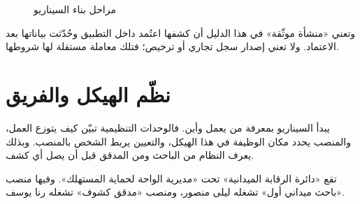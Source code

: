 \begin{figure}[H]
\centering
{}
\rclegend
\caption{مراحل بناء السيناريو}
\label{fig:scenario-build-order}
\end{figure}

وتعني «منشأة موثّقة» في هذا الدليل أن كشفها اعتُمد داخل التطبيق وحُدّثت بياناتها بعد الاعتماد. ولا تعني إصدار سجل تجاري أو ترخيص؛ فتلك معاملة مستقلة لها شروطها.

\section{نظّم الهيكل والفريق}
\label{sec:scenario-team}

يبدأ السيناريو بمعرفة من يعمل وأين. فالوحدات التنظيمية تبيّن كيف يتوزع العمل، والمنصب يحدد مكان الوظيفة في هذا الهيكل، والتعيين يربط الشخص بالمنصب. وبذلك يعرف النظام من الباحث ومن المدقق قبل أن يصل أي كشف.

\begin{rcnote}
تقع «دائرة الرقابة الميدانية» تحت «مديرية الواحة لحماية المستهلك». وفيها منصب «باحث ميداني أول» تشغله ليلى منصور، ومنصب «مدقق كشوف» تشغله رنا يوسف.
\end{rcnote}

